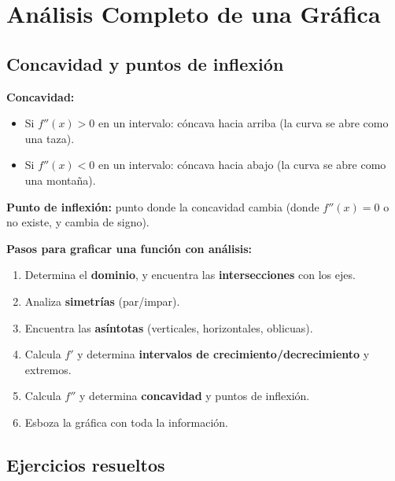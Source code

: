 \documentclass[12pt, letterpaper]{article}
\begin{document}
\newpage


\section{Análisis Completo de una Gráfica}

\subsection{Concavidad y puntos de inflexión}

\begin{cuadroteoria}
  \textbf{Concavidad:}
  \begin{itemize}[leftmargin=*]
    \item Si $f''(x) > 0$ en un intervalo: cóncava hacia arriba (la curva se abre como una taza).
    \item Si $f''(x) < 0$ en un intervalo: cóncava hacia abajo (la curva se abre como una montaña).
  \end{itemize}

  \textbf{Punto de inflexión:} punto donde la concavidad cambia (donde $f''(x) = 0$ o no existe, y cambia de signo).
\end{cuadroteoria}

\begin{cuadropasos}
  \textbf{Pasos para graficar una función con análisis:}
  \begin{enumerate}
    \item Determina el \textbf{dominio}, y encuentra las \textbf{intersecciones} con los ejes.
    \item Analiza \textbf{simetrías} (par/impar).
    \item Encuentra las \textbf{asíntotas} (verticales, horizontales, oblicuas).
    \item Calcula $f'$ y determina \textbf{intervalos de crecimiento/decrecimiento} y extremos.
    \item Calcula $f''$ y determina \textbf{concavidad} y puntos de inflexión.
    \item Esboza la gráfica con toda la información.
  \end{enumerate}
\end{cuadropasos}

\subsection{Ejercicios resueltos}
\end{document}

